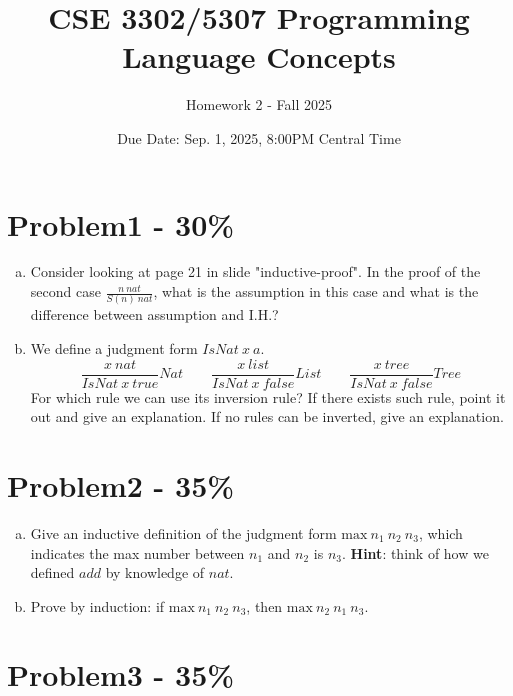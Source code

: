 \documentclass{article}
\newcommand{\answerboxsmall}{
    \vspace{3cm} %
}
\begin{document}
\title{CSE 3302/5307 Programming Language Concepts}
\author{Homework 2 - Fall 2025}
\date{Due Date: Sep. 1, 2025, 8:00PM Central Time}
\maketitle
\thispagestyle{fancy}

\section*{Problem1 - 30\%}
\fontsize{12pt}{0}
\begin{enumerate}[(a)]    
    \item Consider looking at page 21 in slide "inductive-proof". In the proof of the second case $\frac{n\ nat}{S(n)\ nat}$, what is the assumption in this case and what is the difference between assumption and I.H.?
    \answerboxsmall

    \item We define a judgment form $IsNat\ x\ a$.
    \[
    \frac{x\ nat}{IsNat\ x\ true}Nat
    \qquad
    \frac{x\ list}{IsNat\ x\ false}List
    \qquad
	\frac{x\ tree}{IsNat\ x\ false}Tree
    \]
    For which rule we can use its inversion rule? If there exists such rule, point it out and give an explanation. If no rules can be inverted, give an explanation.
    \answerboxsmall
\end{enumerate}

\section*{Problem2 - 35\%}

\begin{enumerate}[(a)]
    \item Give an inductive definition of the judgment form
    $\mbox{max}\ n_1\ n_2\ n_3$, which indicates the max number between $n_1$ and $n_2$ is $n_3$. 
    \newline
    \textbf{Hint}: think of how we defined $add$ by knowledge of $nat$. 
    \answerboxsmall

    \item Prove by induction:
    if $\mbox{max}\ n_1\ n_2\ n_3$, then  $\mbox{max}\ n_2\ n_1\ n_3$.
    \answerboxsmall
\end{enumerate}

\section*{Problem3 - 35\%}
\end{document}
